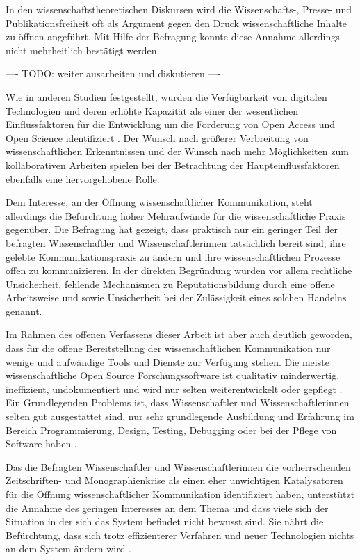 In den wissenschaftstheoretischen Diskursen wird die Wissenschafts-, Presse- und Publikationsfreiheit oft als Argument gegen den Druck wissenschaftliche Inhalte zu öffnen angeführt. Mit Hilfe der Befragung konnte diese Annahme allerdings nicht mehrheitlich bestätigt werden.

---- TODO: weiter ausarbeiten und diskutieren ----

Wie in anderen Studien festgestellt, wurden die Verfügbarkeit von digitalen Technologien und deren erhöhte Kapazität als einer der wesentlichen Einflussfaktoren für die Entwicklung um die Forderung von Open Access und Open Science identifiziert \cite{eu_open_science_2015}. Der Wunsch nach größerer Verbreitung von wissenschaftlichen Erkenntnissen und der Wunsch nach mehr Möglichkeiten zum kollaborativen Arbeiten spielen bei der Betrachtung der Haupteinflussfaktoren ebenfalls eine hervorgehobene Rolle.

Dem Interesse, an der Öffnung wissenschaftlicher Kommunikation, steht allerdings die Befürchtung hoher Mehraufwände für die wissenschaftliche Praxis gegenüber. Die Befragung hat gezeigt, dass praktisch nur ein geringer Teil der befragten Wissenschaftler und Wissenschaftlerinnen tatsächlich bereit sind, ihre gelebte Kommunikationspraxis zu ändern und ihre wissenschaftlichen Prozesse offen zu kommunizieren. In der direkten Begründung wurden vor allem rechtliche Unsicherheit, fehlende Mechanismen zu Reputationsbildung durch eine offene Arbeitsweise und sowie Unsicherheit bei der Zulässigkeit eines solchen Handelns genannt.

Im Rahmen des offenen Verfassens dieser Arbeit ist aber auch deutlich geworden, dass für die offene Bereitstellung der wissenschaftlichen Kommunikation nur wenige und aufwändige Tools und Dienste zur Verfügung stehen. Die meiste wissenschaftliche Open Source Forschungssoftware ist qualitativ minderwertig, ineffizient, undokumentiert und wird nur selten weiterentwickelt oder gepflegt \cite{hey_2015_open}. Ein Grundlegenden Problems ist, dass Wissenschaftler und Wissenschaftlerinnen selten gut ausgestattet sind, nur sehr grundlegende Ausbildung und Erfahrung im Bereich Programmierung, Design, Testing, Debugging oder bei der Pflege von Software haben \cite{hey_2015_open}.

Das die Befragten Wissenschaftler und Wissenschaftlerinnen die vorherrschenden Zeitschriften- und Monographienkrise als einen eher unwichtigen Katalysatoren für die Öffnung wissenschaftlicher Kommunikation identifiziert haben, unterstützt die Annahme des geringen Interesses an dem Thema und dass viele sich der Situation in der sich das System befindet nicht bewusst sind. Sie nährt die Befürchtung, dass sich trotz effizienterer Verfahren und neuer Technologien nichts an dem System ändern wird \cite{Parks_2002_acadamic_faust}.

